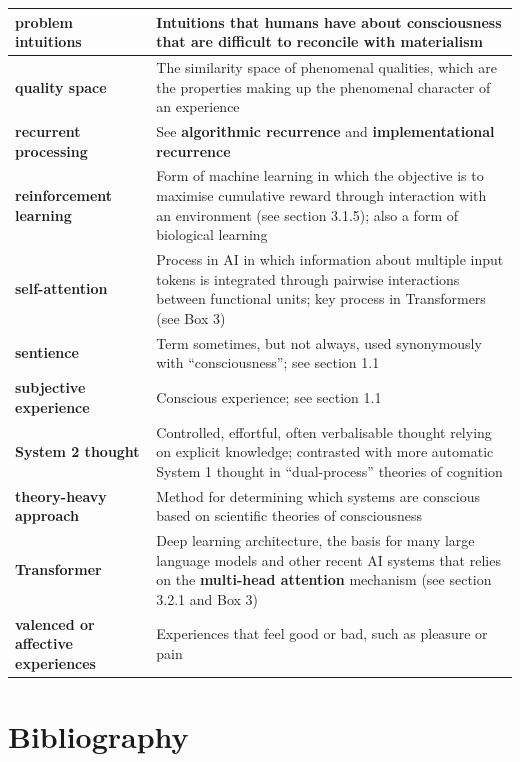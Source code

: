\documentclass[12pt]{article}
\begin{document}
\begin{longtable}{|>{\raggedright\arraybackslash}p{}|>{\raggedright\arraybackslash}p{}|}
\hline
\textbf{problem intuitions} & Intuitions that humans have about consciousness that are difficult to reconcile with materialism \\
\hline
\textbf{quality space} & The similarity space of phenomenal qualities, which are the properties making up the phenomenal character of an experience \\
\hline
\textbf{recurrent processing} & See \textbf{algorithmic recurrence} and \textbf{implementational recurrence} \\
\hline
\textbf{reinforcement learning} & Form of machine learning in which the objective is to maximise cumulative reward through interaction with an environment (see section 3.1.5); also a form of biological learning \\
\hline
\textbf{self-attention} & Process in AI in which information about multiple input tokens is integrated through pairwise interactions between functional units; key process in Transformers (see Box 3) \\
\hline
\textbf{sentience} & Term sometimes, but not always, used synonymously with ``consciousness''; see section 1.1 \\
\hline
\textbf{subjective experience} & Conscious experience; see section 1.1 \\
\hline
\textbf{System 2 thought} & Controlled, effortful, often verbalisable thought relying on explicit knowledge; contrasted with more automatic System 1 thought in ``dual-process'' theories of cognition \\
\hline
\textbf{theory-heavy approach} & Method for determining which systems are conscious based on scientific theories of consciousness \\
\hline
\textbf{Transformer} & Deep learning architecture, the basis for many large language models and other recent AI systems that relies on the \textbf{multi-head attention} mechanism (see section 3.2.1 and Box 3) \\
\hline
\textbf{valenced or affective experiences} & Experiences that feel good or bad, such as pleasure or pain \\
\hline
\end{longtable}

\newpage

\section*{Bibliography}

\noindent
\end{document}
